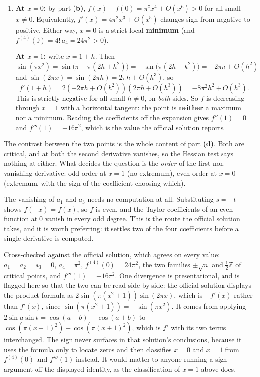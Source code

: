 \begin{exercisesolution}
\begin{enumerate}[label=\textbf{(\alph*)}]
  \item \textbf{At $x = 0$:} by part \textbf{(b)}, $f(x) - f(0) = \pi^2 x^4 + O(x^6) > 0$ for all
    small $x \neq 0$. Equivalently, $f'(x) = 4\pi^2 x^3 + O(x^5)$ changes sign from negative to
    positive. Either way, $x = 0$ is a strict local \textbf{minimum} (and $f^{(4)}(0) = 4!\,a_4 =
    24\pi^2 > 0$).

    \textbf{At $x = 1$:} write $x = 1 + h$. Then $\sin(\pi x^2) = \sin\big(\pi + \pi(2h+h^2)\big) =
    -\sin\big(\pi(2h+h^2)\big) = -2\pi h + O(h^2)$ and $\sin(2\pi x) = \sin(2\pi h) = 2\pi h +
    O(h^3)$, so
\[f'(1+h) = 2(-2\pi h + O(h^2))(2\pi h + O(h^3)) = -8\pi^2 h^2 + O(h^3).\]
    This is strictly negative for all small $h \neq 0$, on \emph{both} sides. So $f$ is decreasing
    through $x = 1$ with a horizontal tangent: the point is \textbf{neither} a maximum nor a
    minimum. Reading the coefficients off the expansion gives $f''(1) = 0$ and
    $f'''(1) = -16\pi^2$, which is the value the official solution reports.
\end{enumerate}
\begin{remark}
The contrast between the two points is the whole content of part \textbf{(d)}. Both are critical,
and at both the second derivative vanishes, so the Hessian test says nothing at either. What decides
the question is the \emph{order} of the first non-vanishing derivative: odd order at $x=1$ (no
extremum), even order at $x=0$ (extremum, with the sign of the coefficient choosing which).
\end{remark}
\begin{remark}
The vanishing of $a_1$ and $a_3$ needs no computation at all. Substituting $s = -t$ shows
$f(-x) = f(x)$, so $f$ is even, and the Taylor coefficients of an even function at $0$ vanish in
every odd degree. This is the route the official solution takes, and it is worth preferring: it
settles two of the four coefficients before a single derivative is computed.
\end{remark}
\begin{ainote}
Cross-checked against the official solution, which agrees on every value: $a_1 = a_2 = a_3 = 0$,
$a_4 = \pi^2$, $f^{(4)}(0) = 24\pi^2$, the two families $\pm\sqrt{n}$ and $\tfrac12\mathbb{Z}$ of
critical points, and $f'''(1) = -16\pi^2$. One divergence is presentational, and is flagged here so
that the two can be read side by side: the official solution displays the product formula as
$2\sin(\pi(x^2+1))\sin(2\pi x)$, which is $-f'(x)$ rather than $f'(x)$, since
$\sin(\pi(x^2+1)) = -\sin(\pi x^2)$. It comes from applying $2\sin a\sin b = \cos(a-b) - \cos(a+b)$
to $\cos(\pi(x-1)^2) - \cos(\pi(x+1)^2)$, which is $f'$ with its two terms interchanged. The sign
never surfaces in that solution's conclusions, because it uses the formula only to locate zeros and
then classifies $x=0$ and $x=1$ from $f^{(4)}(0)$ and $f'''(1)$ instead. It would matter to anyone
running a sign argument off the displayed identity, as the classification of $x=1$ above does.
\end{ainote}
\end{exercisesolution}

